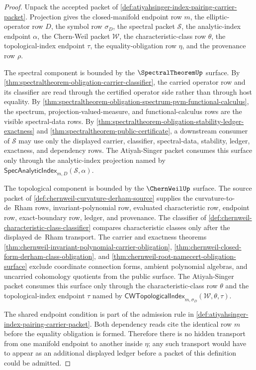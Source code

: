 \begin{proof}
Unpack the accepted packet of \autoref{def:atiyahsinger-index-pairing-carrier-packet}. Projection gives the closed-manifold endpoint row $m$, the elliptic-operator row $D$, the symbol row $\sigma_D$, the spectral packet $\mathcal{S}$, the analytic-index endpoint $\alpha$, the Chern-Weil packet $\mathcal{W}$, the characteristic-class row $\theta$, the topological-index endpoint $\tau$, the equality-obligation row $\eta$, and the provenance row $\rho$.

The spectral component is bounded by the $\SpectralTheoremUp$ surface. By \autoref{thm:spectraltheorem-obligation-carrier-classifier}, the carried operator row and its classifier are read through the certified operator side rather than through host equality. By \autoref{thm:spectraltheorem-obligation-spectrum-pvm-functional-calculus}, the spectrum, projection-valued-measure, and functional-calculus rows are the visible spectral-data rows. By \autoref{thm:spectraltheorem-obligation-stability-ledger-exactness} and \autoref{thm:spectraltheorem-public-certificate}, a downstream consumer of $\mathcal{S}$ may use only the displayed carrier, classifier, spectral-data, stability, ledger, exactness, and dependency rows. The Atiyah-Singer packet consumes this surface only through the analytic-index projection named by $\mathsf{SpecAnalyticIndex}_{m,D}(\mathcal{S},\alpha)$.

The topological component is bounded by the $\ChernWeilUp$ surface. The source packet of \autoref{def:chernweil-curvature-derham-source} supplies the curvature-to-de~Rham rows, invariant-polynomial row, evaluated characteristic row, endpoint row, exact-boundary row, ledger, and provenance. The classifier of \autoref{def:chernweil-characteristic-class-classifier} compares characteristic classes only after the displayed de~Rham transport. The carrier and exactness theorems \autoref{thm:chernweil-invariant-polynomial-carrier-obligation}, \autoref{thm:chernweil-closed-form-derham-class-obligation}, and \autoref{thm:chernweil-root-namecert-obligation-surface} exclude coordinate connection forms, ambient polynomial algebras, and uncarried cohomology quotients from the public surface. The Atiyah-Singer packet consumes this surface only through the characteristic-class row $\theta$ and the topological-index endpoint $\tau$ named by $\mathsf{CWTopologicalIndex}_{m,\sigma_D}(\mathcal{W},\theta,\tau)$.

The shared endpoint condition is part of the admission rule in \autoref{def:atiyahsinger-index-pairing-carrier-packet}. Both dependency reads cite the identical row $m$ before the equality obligation is formed. Therefore there is no hidden transport from one manifold endpoint to another inside $\eta$; any such transport would have to appear as an additional displayed ledger before a packet of this definition could be admitted.


\end{proof}
